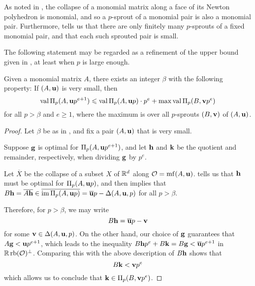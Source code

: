 \documentclass[11pt]{amsart}
\renewcommand{\!}[1]{{\color{red}\text{$\star$\,}#1\,$\star$}}
\newcommand{\ol}[1]{\overline{#1}}
\begin{document}
\begin{remark}
\label{p-sprout: R} 
As noted in , the collapse of a monomial matrix along a face of its Newton polyhedron is monomial, and so a $p$-sprout of a monomial pair is also a monomial pair.  Furthermore,    tells us that there are only finitely many $p$-sprouts of a fixed monomial pair, and that each such sprouted pair is small. 
 \end{remark}

The following statement may be regarded as a refinement of the upper bound given in , at least when $p$ is large enough.

\begin{corollary}
Given a monomial matrix $A$, there exists an integer $\beta$ with the following property\textup:  If $(A, \mathbf{u})$ is very small, then
%
\[ \operatorname{val} \Pi_p(A, \mathbf{u}p^{e+1})  \leqslant  \operatorname{val} \Pi_p(A, \mathbf{u}p) \cdot p^e +  \max \operatorname{val} \Pi_p(B, \mathbf{v}p^e) \] 
%
for all $p > \beta$ and $e \geq 1$, where the maximum is over all $p$-sprouts $(B, \mathbf{v})$ of $(A, \mathbf{u})$.  
\end{corollary}

\begin{proof}  Let $\beta$ be as in , and fix a pair $(A, \mathbf{u})$ that is very small.


Suppose $\mathbf{g}$ is optimal for $\Pi_p(A, \mathbf{u}p^{e+1})$, and let $\mathbf{h}$ and $\mathbf{k}$ be the quotient and remainder, respectively, when dividing $\mathbf{g}$ by $p^e$.

Let $\ol{X}$ be the collapse of a subset $X$ of $\mathbb{R}^d$ along $\mathcal{O} = \operatorname{mf}(A, \mathbf{u})$.   tells us that $\mathbf{h}$ must be optimal for $\Pi_p(A, \mathbf{u}p)$, and  then implies that $B \vv{h} = \ol{A \vv{h}} \in \ol{\im \IP_p(A, \vv{u}p)} = \ol{\vv{u}}p - \Delta(A, \vv{u}, p)$ for all $p > \beta$.   

Therefore, for $p > \beta$, we may write \[ B \vv{h} = \ol{\vv{u}}p - \vv{v}\] for some $\mathbf{v} \in \Delta(A, \mathbf{u}, p)$.  On the other hand, our choice of $\mathbf{g}$ guarantees that $A \mathbf{g} < \mathbf{u}p^{e+1}$, which leads to the inequality $B \vv{h} p^e + B \vv{k} = B \vv{g} <  \ol{\vv{u}}p^{e+1}$  in $\mathbb{R} \operatorname{rb}(\mathcal{O})^{\perp}$.  Comparing this with the above description of $B \mathbf{h}$ shows that \[ B \mathbf{k} < \mathbf{v} p^e \] which allows us to conclude that $\mathbf{k} \in \Pi_p(B, \mathbf{v} p^e)$.  %
\end{proof}
\end{document}
